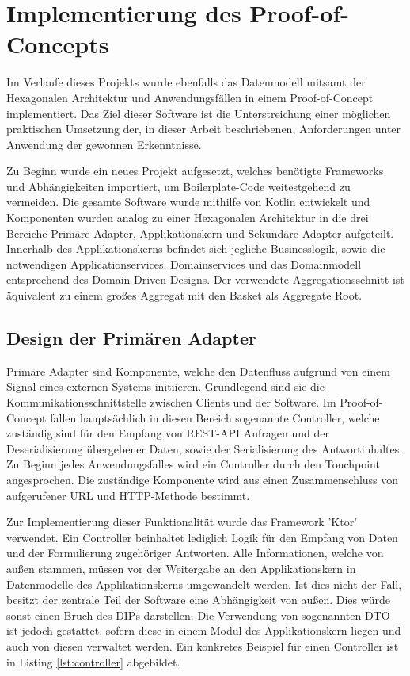 \chapter{Implementierung des Proof-of-Concepts}

Im Verlaufe dieses Projekts wurde ebenfalls das Datenmodell mitsamt der Hexagonalen Architektur und Anwendungsfällen in einem Proof-of-Concept implementiert. Das Ziel dieser Software ist die Unterstreichung einer möglichen praktischen Umsetzung der, in dieser Arbeit beschriebenen, Anforderungen unter Anwendung der gewonnen Erkenntnisse. 

Zu Beginn wurde ein neues Projekt aufgesetzt, welches benötigte Frameworks und Abhängigkeiten importiert, um Boilerplate-Code weitestgehend zu vermeiden. Die gesamte Software wurde mithilfe von Kotlin entwickelt und Komponenten wurden analog zu einer Hexagonalen Architektur in die drei Bereiche Primäre Adapter, Applikationskern und Sekundäre Adapter aufgeteilt. Innerhalb des Applikationskerns befindet sich jegliche Businesslogik, sowie die notwendigen Applicationservices, Domainservices und das Domainmodell entsprechend des Domain-Driven Designs. Der verwendete Aggregationsschnitt ist äquivalent zu einem großes Aggregat mit den Basket als Aggregate Root.


\section{Design der Primären Adapter}

Primäre Adapter sind Komponente, welche den Datenfluss aufgrund von einem Signal eines externen Systems initiieren. Grundlegend sind sie die Kommunikationsschnittstelle zwischen Clients und der Software. Im Proof-of-Concept fallen hauptsächlich in diesen Bereich sogenannte Controller, welche zuständig sind für den Empfang von REST-API Anfragen und der Deserialisierung übergebener Daten, sowie der Serialisierung des Antwortinhaltes. Zu Beginn jedes Anwendungsfalles wird ein Controller durch den Touchpoint angesprochen. Die zuständige Komponente wird aus einen Zusammenschluss von aufgerufener URL und HTTP-Methode bestimmt. 

Zur Implementierung dieser Funktionalität wurde das Framework 'Ktor' verwendet. Ein Controller beinhaltet lediglich Logik für den Empfang von Daten und der Formulierung zugehöriger Antworten. Alle Informationen, welche von außen stammen, müssen vor der Weitergabe an den Applikationskern in Datenmodelle des Applikationskerns umgewandelt werden. Ist dies nicht der Fall, besitzt der zentrale Teil der Software eine Abhängigkeit von außen. Dies würde sonst einen Bruch des \acrlong{DIP}s darstellen. Die Verwendung von sogenannten \acrfull{DTO} ist jedoch gestattet, sofern diese in einem Modul des Applikationskern liegen und auch von diesen verwaltet werden. Ein konkretes Beispiel für einen Controller ist in Listing \ref{lst:controller} abgebildet.

